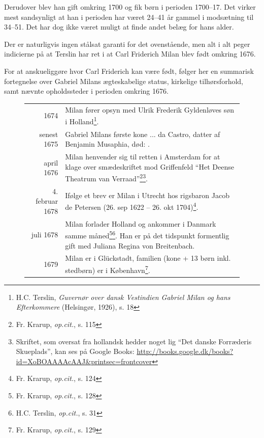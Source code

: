 \documentclass[
	a4paper,
	12pt,
	final
]{memoir}
\begin{document}
Derudover blev han gift omkring 1700 og fik børn i perioden 1700--17. Det virker mest sandsynligt at han i perioden har været 24--41 år gammel i modsætning til 34--51. Det har dog ikke været muligt at finde andet belæg for hans alder.

Der er naturligvis ingen stålsat garanti for det ovenstående, men alt i alt peger indicierne på at Terslin har ret i at Carl Friderich Milan blev født omkring 1676.

For at anskueliggøre hvor Carl Friderich kan være født, følger her en summarisk fortegnelse over Gabriel Milans ægteskabelige status, kirkelige tilhørsforhold, samt nævnte opholdssteder i perioden omkring 1676.

\begin{savenotes}%
\label{milan:ophold}%
\begin{figure}[H]%
\centerfloat%
\begin{tabular}{r p{}}
	1674 & Milan fører opsyn med Ulrik Frederik Gyldenløves søn i Holland\footnote{H.C. Terslin, \emph{Guvernør over dansk Vestindien Gabriel Milan og hans Efterkommere} (Helsingør, 1926), s. 18 }. \\
	senest 1675 & Gabriel Milans første kone ... da Castro, datter af Benjamin Musaphia, død: . \\ %
	april 1676 & Milan henvender sig til retten i Amsterdam for at klage over smædeskriftet mod Griffenfeld \enquote{Het Deense Theatrum van Verraad}\footnote{Fr. Krarup, \emph{op.cit.}, s. 115}\footnote{Skriftet, som oversat fra hollandsk hedder noget lig \enquote{Det danske Forræderis Skueplads}, kan ses på Google Books: \url{http://books.google.dk/books?id=XoBOAAAAcAAJ&printsec=frontcover}}. \\
	4. februar 1678 & Ifølge et brev\label{brev1678} er Milan i Utrecht hos rigsbaron Jacob de Petersen (26. sep 1622 -- 26. okt 1704)\footnote{Fr. Krarup, \emph{op.cit.}, s. 124}. \\
	juli 1678 & Milan forlader Holland og ankommer i Danmark samme måned\footnote{Fr. Krarup, \emph{op.cit.}, s. 128}\footnote{H.C. Terslin, \emph{op.cit.}, s. 31}. Han er på det tidspunkt formentlig gift med Juliana Regina von Breitenbach. \\
	1679 & Milan er i Glückstadt, familien (kone + 13 børn inkl. stedbørn) er i København\footnote{Fr. Krarup, \emph{op.cit.}, s. 129}. \\

\end{tabular}
\end{figure}
\end{savenotes}
\end{document}
